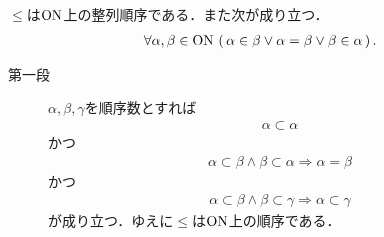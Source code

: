 	\begin{screen}
		\begin{thm}[$\ON$の整列性]\label{thm:On_is_wellordered}
			$\leq$は$\ON$上の整列順序である．また次が成り立つ．
			\begin{align}
				\forall \alpha,\beta \in \mathrm{ON}\,
				\left(\, \alpha \in \beta \vee \alpha = \beta \vee \beta \in \alpha\, \right).
			\end{align}
		\end{thm}
	\end{screen}
	
	\begin{prf}\mbox{}
		\begin{description}
			\item[第一段]
				$\alpha,\beta,\gamma$を順序数とすれば
				\begin{align}
					\alpha \subset \alpha
				\end{align}
				かつ
				\begin{align}
					\alpha \subset \beta \wedge \beta \subset \alpha \Longrightarrow \alpha = \beta
				\end{align}
				かつ
				\begin{align}
					\alpha \subset \beta \wedge \beta \subset \gamma \Longrightarrow \alpha \subset \gamma
				\end{align}
				が成り立つ．ゆえに$\leq$は$\ON$上の順序である．
				

\end{description}
\end{prf}

